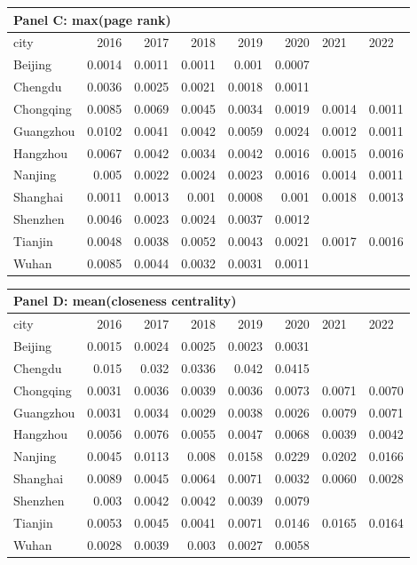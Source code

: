 \begin{tabular}{lrrrrrll}
    \multicolumn{8}{l}{\textbf{Panel C: max(page rank)}}\\
\hline
 city      &   2016 &   2017 &   2018 &   2019 &   2020 & 2021   & 2022   \\
\hline
 Beijing   & 0.0014 & 0.0011 & 0.0011 & 0.001  & 0.0007 &        &        \\
 Chengdu   & 0.0036 & 0.0025 & 0.0021 & 0.0018 & 0.0011 &        &        \\
 Chongqing & 0.0085 & 0.0069 & 0.0045 & 0.0034 & 0.0019 & 0.0014 & 0.0011 \\
 Guangzhou & 0.0102 & 0.0041 & 0.0042 & 0.0059 & 0.0024 & 0.0012 & 0.0011 \\
 Hangzhou  & 0.0067 & 0.0042 & 0.0034 & 0.0042 & 0.0016 & 0.0015 & 0.0016 \\
 Nanjing   & 0.005  & 0.0022 & 0.0024 & 0.0023 & 0.0016 & 0.0014 & 0.0011 \\
 Shanghai  & 0.0011 & 0.0013 & 0.001  & 0.0008 & 0.001  & 0.0018 & 0.0013 \\
 Shenzhen  & 0.0046 & 0.0023 & 0.0024 & 0.0037 & 0.0012 &        &        \\
 Tianjin   & 0.0048 & 0.0038 & 0.0052 & 0.0043 & 0.0021 & 0.0017 & 0.0016 \\
 Wuhan     & 0.0085 & 0.0044 & 0.0032 & 0.0031 & 0.0011 &        &        \\
\hline
\end{tabular}

\begin{tabular}{lrrrrrll}
    \multicolumn{8}{l}{\textbf{Panel D: mean(closeness centrality)}}\\
\hline
 city      &   2016 &   2017 &   2018 &   2019 &   2020 & 2021   & 2022   \\
\hline
 Beijing   & 0.0015 & 0.0024 & 0.0025 & 0.0023 & 0.0031 &        &        \\
 Chengdu   & 0.015  & 0.032  & 0.0336 & 0.042  & 0.0415 &        &        \\
 Chongqing & 0.0031 & 0.0036 & 0.0039 & 0.0036 & 0.0073 & 0.0071 & 0.0070 \\
 Guangzhou & 0.0031 & 0.0034 & 0.0029 & 0.0038 & 0.0026 & 0.0079 & 0.0071 \\
 Hangzhou  & 0.0056 & 0.0076 & 0.0055 & 0.0047 & 0.0068 & 0.0039 & 0.0042 \\
 Nanjing   & 0.0045 & 0.0113 & 0.008  & 0.0158 & 0.0229 & 0.0202 & 0.0166 \\
 Shanghai  & 0.0089 & 0.0045 & 0.0064 & 0.0071 & 0.0032 & 0.0060 & 0.0028 \\
 Shenzhen  & 0.003  & 0.0042 & 0.0042 & 0.0039 & 0.0079 &        &        \\
 Tianjin   & 0.0053 & 0.0045 & 0.0041 & 0.0071 & 0.0146 & 0.0165 & 0.0164 \\
 Wuhan     & 0.0028 & 0.0039 & 0.003  & 0.0027 & 0.0058 &        &        \\
\hline
\end{tabular}

